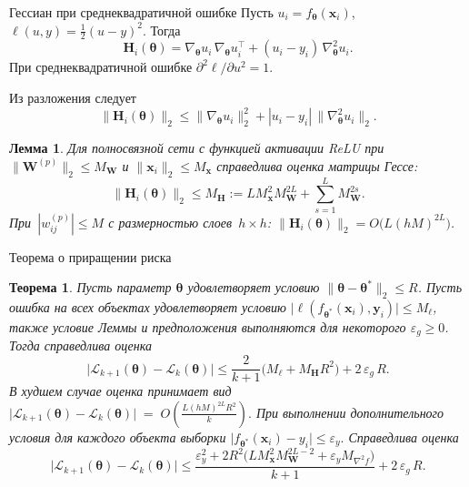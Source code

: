 \documentclass[10pt,pdf,hyperref={unicode}]{beamer}
\newtheorem{rustheorem}{Теорема}
\newtheorem{ruslemma}{Лемма}
\begin{document}
\begin{frame}{Гессиан при среднеквадратичной ошибке}
\justifying
Пусть $u_i=f_{\boldsymbol{\theta}}(\mathbf{x}_i)$, $\ell(u,y)=\tfrac12(u-y)^2$. Тогда
\[
    \mathbf{H}_i(\boldsymbol{\theta})
    =\nabla_{\boldsymbol{\theta}}u_i\,\nabla_{\boldsymbol{\theta}}u_i^{\top}
    +(u_i-y_i)\,\nabla_{\boldsymbol{\theta}}^2 u_i .
\]
При среднеквадратичной ошибке $\partial^2\ell/\partial u^2=1$.

Из разложения следует
\[
    \|\mathbf{H}_i(\boldsymbol{\theta})\|_2
    \le \|\nabla_{\boldsymbol{\theta}}u_i\|_2^2
    +|u_i-y_i|\,\|\nabla_{\boldsymbol{\theta}}^2 u_i\|_2 .
\]

\begin{ruslemma}
Для полносвязной сети с функцией активации ReLU при $\|\mathbf{W}^{(p)}\|_2\le M_{\mathbf{W}}$ и $\|\mathbf{x}_i\|_2\le M_{\mathbf{x}}$ справедлива оценка матрицы Гессе:
\[
    \|\mathbf{H}_i(\boldsymbol{\theta})\|_2
    \le M_{\mathbf{H}}
    := L M_{\mathbf{x}}^2 M_{\mathbf{W}}^{2L}
    +\sum_{s=1}^{L} M_{\mathbf{W}}^{2s}.
\]
При~$|w_{ij}^{(p)}|\le M$ с размерностью слоев~$h\times h$:
$\|\mathbf{H}_i(\boldsymbol{\theta})\|_2=O\!\bigl(L(hM)^{2L}\bigr)$.
\end{ruslemma}
\end{frame}

\begin{frame}{Теорема о приращении риска}
\justifying
\begin{rustheorem}
Пусть параметр $\boldsymbol{\theta}$ удовлетворяет условию $\|\boldsymbol{\theta}-\boldsymbol{\theta}^*\|_2\le R$.
Пусть ошибка на всех объектах удовлетворяет условию $\bigl|\ell(f_{\boldsymbol{\theta}^*}(\mathbf{x}_i),\mathbf{y}_i)\bigr|\le M_{\ell}$, также условие Леммы и предположения выполняются для некоторого $\varepsilon_g\ge 0$.
Тогда справедлива оценка
\[
  \bigl|\mathcal{L}_{k+1}(\boldsymbol{\theta}) - \mathcal{L}_k(\boldsymbol{\theta})\bigr|
  \le \frac{2}{k+1}\bigl( M_{\ell} + M_{\mathbf{H}} R^2 \bigr) + 2\,\varepsilon_g\, R .
\]
В худшем случае оценка принимает вид
$\bigl|\mathcal{L}_{k+1}(\boldsymbol{\theta}) - \mathcal{L}_k(\boldsymbol{\theta})\bigr|\;=\; O\!\left(\frac{L(hM)^{2L} R^2}{k}\right).$
При выполнении дополнительного условия для каждого объекта выборки
$\bigl|f_{\boldsymbol{\theta}^*}(\mathbf{x}_i)-y_i\bigr|\le \varepsilon_y.$
Справедлива оценка
\[
  \bigl|\mathcal{L}_{k+1}(\boldsymbol{\theta}) - \mathcal{L}_k(\boldsymbol{\theta})\bigr|
  \le
  \frac{\varepsilon_y^2 + 2R^2\bigl(L M_{\mathbf{x}}^2 M_{\mathbf{W}}^{2L-2} + \varepsilon_y M_{\nabla^2 f}\bigr)}{k+1}
  + 2\,\varepsilon_g\,R .
\]
\end{rustheorem}
\end{frame}
\end{document}
